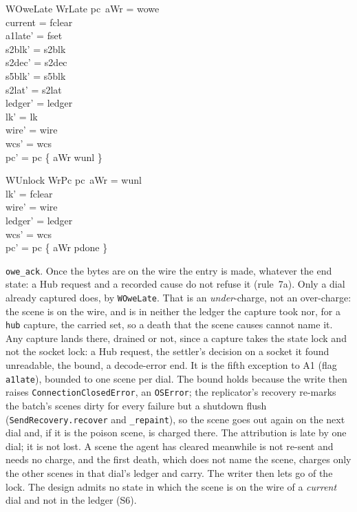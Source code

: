 \documentclass[a4paper,10pt,fleqn]{article}
\begin{document}
\begin{schema}{WOweLate}
  WrLate
\where
  pc~aWr = wowe \\
  current = fclear \\
  a1late' = fset \\
  s2blk' = s2blk \\
  s2dec' = s2dec \\
  s5blk' = s5blk \\
  s2lat' = s2lat \\
  ledger' = ledger \\
  lk' = lk \\
  wire' = wire \\
  wcs' = wcs \\
  pc' = pc \oplus \{ aWr \mapsto wunl \}
\end{schema}

\begin{schema}{WUnlock}
  WrPc
\where
  pc~aWr = wunl \\
  lk' = fclear \\
  wire' = wire \\
  ledger' = ledger \\
  wcs' = wcs \\
  pc' = pc \oplus \{ aWr \mapsto pdone \}
\end{schema}

\texttt{owe\_ack}.  Once the bytes are on the wire the entry is made, whatever the
end state: a Hub request and a recorded cause do not refuse it (rule~7a).  Only a
dial already captured does, by \texttt{WOweLate}.  That is an \emph{under}-charge,
not an over-charge: the scene is on the wire, and is in neither the ledger the
capture took nor, for a \texttt{hub} capture, the carried set, so a death that
the scene causes cannot name it.  Any capture lands there, drained or not, since
a capture takes the state lock and not the socket lock: a Hub request, the
settler's decision on a socket it found unreadable, the bound, a decode-error
end.  It is the fifth exception to A1 (flag \texttt{a1late}), bounded to one
scene per dial.  The bound holds because the write then raises
\texttt{ConnectionClosedError}, an \texttt{OSError}; the replicator's recovery
re-marks the batch's scenes dirty for every failure but a shutdown flush
(\texttt{SendRecovery.recover} and \texttt{\_repaint}), so the scene goes out
again on the next dial and, if it is the poison scene, is charged there.  The
attribution is late by one dial; it is not lost.  A scene the agent has cleared
meanwhile is not re-sent and needs no charge, and the first death, which does
not name the scene, charges only the other scenes in that dial's ledger and
carry.  The writer then lets go of the
lock.  The design admits no state in which the scene is on the wire of a
\emph{current} dial and not in the ledger (S6).
\end{document}
